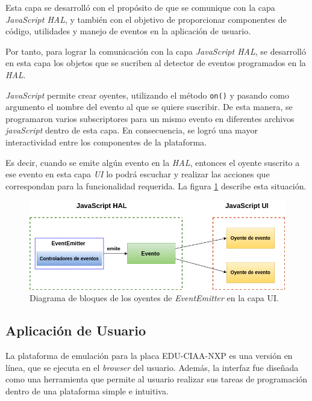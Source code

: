 Esta capa se desarrolló con el propósito de que se comunique con la capa \textit{JavaScript HAL}, y también con el objetivo de proporcionar componentes de código, utilidades y manejo de eventos en la aplicación de usuario.

Por tanto, para lograr la comunicación con la capa \textit{JavaScript HAL}, se desarrolló en esta capa los objetos que se sucriben al detector de eventos programados en la \textit{HAL}.

\textit{JavaScript} permite crear oyentes, utilizando el método \texttt{on()} y pasando como argumento el nombre del evento al que se quiere suscribir. De esta manera, se  programaron varios subscriptores para un mismo evento en diferentes archivos \textit{javaScript} dentro de esta capa. En consecuencia, se logró una mayor interactividad entre los componentes de la plataforma.

Es decir, cuando se emite algún evento en la \textit{HAL}, entonces el oyente suscrito a ese evento en esta capa \textit{UI} lo podrá escuchar y realizar las acciones que correspondan para la funcionalidad requerida. La figura \ref{fig:EventemitterNodeJSUI} describe esta situación.


\begin{figure}[ht]
	\centering
	\includegraphics[scale=.51]{./Figures/EventemitterNodeJSUI.png}
	\caption{Diagrama de bloques de los oyentes de \textit{EventEmitter} en la capa UI.}
	\label{fig:EventemitterNodeJSUI}
\end{figure}




\subsection{Aplicación de Usuario}
La plataforma de emulación para la placa EDU-CIAA-NXP es una versión en línea, que se ejecuta en el \textit{browser} del usuario. Además, la interfaz fue diseñada como una herramienta que permite al usuario realizar sus tareas de programación dentro de una plataforma simple e intuitiva.

